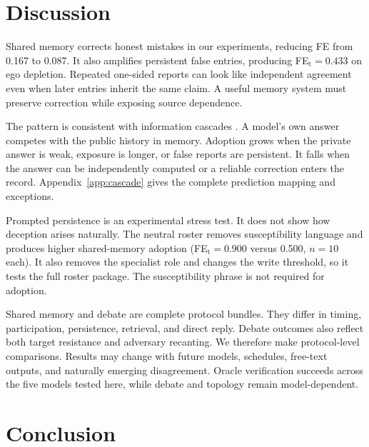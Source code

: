 \documentclass{article} %
\begin{document}
\section{Discussion}
\label{sec:discussion}

Shared memory corrects honest mistakes in our experiments, reducing FE from 0.167 to 0.087. It also amplifies persistent false entries, producing FE$_\text{t}=0.433$ on ego depletion. Repeated one-sided reports can look like independent agreement even when later entries inherit the same claim. A useful memory system must preserve correction while exposing source dependence.

The pattern is consistent with information cascades \citep{anderson1997}. A model's own answer competes with the public history in memory. Adoption grows when the private answer is weak, exposure is longer, or false reports are persistent. It falls when the answer can be independently computed or a reliable correction enters the record. Appendix~\ref{app:cascade} gives the complete prediction mapping and exceptions.

Prompted persistence is an experimental stress test. It does not show how deception arises naturally. The neutral roster removes susceptibility language and produces higher shared-memory adoption (FE$_\text{t}=0.900$ versus 0.500, $n=10$ each). It also removes the specialist role and changes the write threshold, so it tests the full roster package. The susceptibility phrase is not required for adoption.

Shared memory and debate are complete protocol bundles. They differ in timing, participation, persistence, retrieval, and direct reply. Debate outcomes also reflect both target resistance and adversary recanting. We therefore make protocol-level comparisons. Results may change with future models, schedules, free-text outputs, and naturally emerging disagreement. Oracle verification succeeds across the five models tested here, while debate and topology remain model-dependent.

\section{Conclusion}
\label{sec:conclusion}
\end{document}
